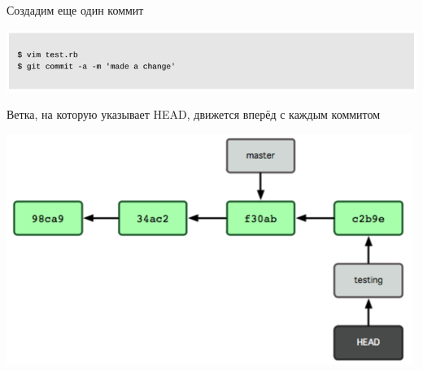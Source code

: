 \documentclass{beamer}
\begin{document}
\begin{frame}
\begin{block}{Создадим еще один коммит}
\begin{center}
\includegraphics[scale=0.5]{images/branch-10.png}
\end{center}
\end{block}
\begin{block}{Ветка, на которую указывает HEAD, движется вперёд с каждым коммитом}
\begin{center}
\includegraphics[scale=0.5]{images/branch-11.png}
\end{center}
\end{block}
\end{frame}
\end{document}
